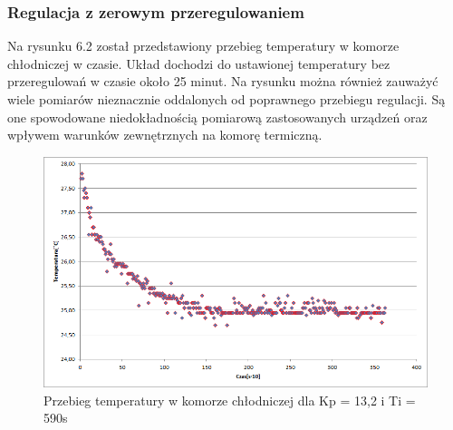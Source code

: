 \documentclass[oneside]{mgr}
\begin{document}
\subsubsection{Regulacja z zerowym przeregulowaniem}
Na rysunku 6.2 został przedstawiony przebieg temperatury w komorze chłodniczej w czasie. Układ dochodzi do ustawionej temperatury bez przeregulowań w czasie około 25 minut. Na rysunku można również zauważyć wiele pomiarów nieznacznie oddalonych od poprawnego przebiegu regulacji. Są one spowodowane niedokładnością pomiarową zastosowanych urządzeń oraz wpływem warunków zewnętrznych na komorę termiczną.

\begin{center}
\begin{figure}[h!]
    \centering
    \includegraphics[width=\textwidth]{ZN11.png}
    \caption{Przebieg temperatury w komorze chłodniczej dla Kp = 13,2 i Ti = 590s}
    \end{figure}
\end{center}
\end{document}
